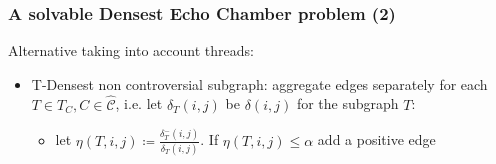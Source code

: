 \documentclass{beamer}
\begin{document}
\begin{frame}[c]
	\frametitle{A solvable Densest Echo Chamber problem (2)}
	Alternative taking into account threads:

	\begin{itemize}
		\item T-Densest non controversial subgraph: aggregate edges separately for each $T \in T_{C}, C \in
			      \hat{\mathcal{C}}$, i.e. let $\delta_{T}(i,j) $ be $\delta(i, j)$
		      for the subgraph $T$:
		      \begin{itemize}
			      \item let $\eta(T, i,j) \coloneqq \frac{\delta_{T} ^{-}
					            (i,j)}{\delta _{T} (i,j)} $. If $\eta(T, i,j) \leq \alpha
			            $ add a positive edge
		      \end{itemize}
	\end{itemize}
\end{frame}
\end{document}
